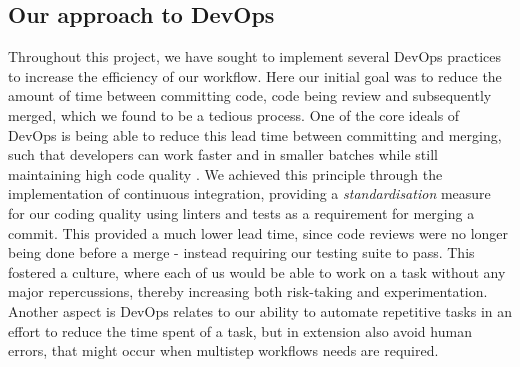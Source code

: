 \subsection{Our approach to DevOps} %
Throughout this project, we have sought to implement several DevOps practices to increase the efficiency of our workflow. Here our initial goal was to reduce the amount of time between committing code, code being review and subsequently merged, which we found to be a tedious process. One of the core ideals of DevOps is being able to reduce this lead time between committing and merging, such that developers can work faster and in smaller batches while still maintaining high code quality \parencite{handbook}. We achieved this principle through the implementation of continuous integration, providing a \textit{standardisation} measure for our coding quality using linters and tests as a requirement for merging a commit. This provided a much lower lead time, since code reviews were no longer being done before a merge - instead requiring our testing suite to pass. This fostered a culture, where each of us would be able to work on a task without any major repercussions, thereby increasing both risk-taking and experimentation. Another aspect is DevOps relates to our ability to automate repetitive tasks in an effort to reduce the time spent of a task, but in extension also avoid human errors, that might occur when multistep workflows needs are required.  
